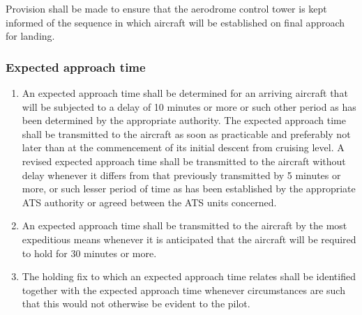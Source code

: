 \documentclass[../main.tex]{subfiles}
\begin{document}
\begin{enumerate}[itemsep=0.2cm]
\begin{enumerate}[labelindent=0pt,itemsep=0.2cm]
            \noindent Provision shall be made to ensure that the aerodrome control tower is kept informed of the sequence in which aircraft will be established on final approach for landing.



        \end{enumerate}
    \end{enumerate}

    \subsubsection{Expected approach time}

    \begin{enumerate}
        \item An expected approach time shall be determined for an arriving aircraft that will be subjected to a delay of 10 minutes or more or such other period as has been determined by the appropriate authority. The expected approach time shall be transmitted to the aircraft as soon as practicable and preferably not later than at the commencement of its initial descent from cruising level. A revised expected approach time shall be transmitted to the aircraft without delay whenever it differs from that previously transmitted by 5 minutes or more, or such lesser period of time as has been established by the appropriate ATS authority or agreed between the ATS units concerned.
        \item An expected approach time shall be transmitted to the aircraft by the most expeditious means whenever it is anticipated that the aircraft will be required to hold for 30 minutes or more.
        \item The holding fix to which an expected approach time relates shall be identified together with the expected approach time whenever circumstances are such that this would not otherwise be evident to the pilot.
    \end{enumerate}
\end{document}
